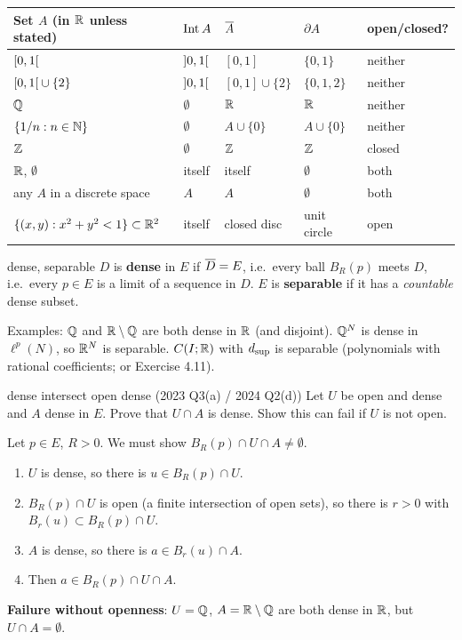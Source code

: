 \begin{center}
\renewcommand{\arraystretch}{1.25}
\begin{tabular}{@{}lllll@{}}\toprule
Set $A$ (in $\mathbb R$ unless stated) & $\operatorname{Int} A$ & $\overline{A}$ & $\partial A$ & open/closed?\\\midrule
$\mathopen{[}0,1\mathclose{[}$ & $\mathopen{]}0,1\mathclose{[}$ & $[0,1]$ & $\{0,1\}$ & neither\\
$\mathopen{[}0,1\mathclose{[}\cup\{2\}$ & $\mathopen{]}0,1\mathclose{[}$ & $[0,1]\cup\{2\}$ & $\{0,1,2\}$ & neither\\
$\mathbb Q$ & $\emptyset$ & $\mathbb R$ & $\mathbb R$ & neither\\
$\{1/n:n\in\mathbb N\}$ & $\emptyset$ & $A\cup\{0\}$ & $A\cup\{0\}$ & neither\\
$\mathbb Z$ & $\emptyset$ & $\mathbb Z$ & $\mathbb Z$ & closed\\
$\mathbb R$, $\emptyset$ & itself & itself & $\emptyset$ & both\\
any $A$ in a discrete space & $A$ & $A$ & $\emptyset$ & both\\
$\{(x,y):x^2+y^2<1\}\subset\mathbb R^2$ & itself & closed disc & unit circle & open\\
\bottomrule\end{tabular}
\end{center}

\begin{defn}{dense, separable}
$D$ is \textbf{dense} in $E$ if $\overline{D}=E$, i.e.\ every ball $B_R(p)$ meets $D$, i.e.\ every
$p\in E$ is a limit of a sequence in $D$. $E$ is \textbf{separable} if it has a
\emph{countable} dense subset.
\end{defn}
Examples: $\mathbb Q$ and $\mathbb R\setminus\mathbb Q$ are both dense in $\mathbb R$ (and disjoint). $\mathbb Q^N$ is dense in
$\ell^p(N)$, so $\mathbb R^N$ is separable. $C(I;\mathbb R)$ with $d_{\sup}$ is separable (polynomials with
rational coefficients; or Exercise 4.11).

\begin{exam}{dense intersect open dense (2023 Q3(a) / 2024 Q2(d))}
Let $U$ be open and dense and $A$ dense in $E$. Prove that $U\cap A$ is dense. Show this can fail
if $U$ is not open.
\end{exam}
\begin{answer}
Let $p\in E$, $R>0$. We must show $B_R(p)\cap U\cap A\ne\emptyset$.
\begin{enumerate}
\item $U$ is dense, so there is $u\in B_R(p)\cap U$.
\item $B_R(p)\cap U$ is open (a finite intersection of open sets), so there is $r>0$ with
  $B_r(u)\subset B_R(p)\cap U$.
\item $A$ is dense, so there is $a\in B_r(u)\cap A$.
\item Then $a\in B_R(p)\cap U\cap A$.
\end{enumerate}
\textbf{Failure without openness}: $U=\mathbb Q$, $A=\mathbb R\setminus\mathbb Q$ are both dense in $\mathbb R$, but
$U\cap A=\emptyset$.
\end{answer}

